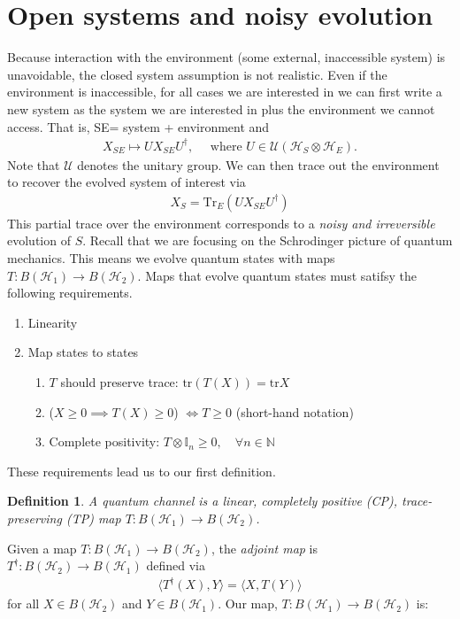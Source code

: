 \documentclass[10pt,oneside,longbibliography]{report}
\newtheorem{definition}{Definition}[section]
\begin{document}
\section{Open systems and noisy evolution}
Because interaction with the environment (some external, inaccessible system) is unavoidable, the closed system assumption is not realistic. Even if the environment is inaccessible, for all cases we are interested in we can first write a new system as the system we are interested in plus the environment we cannot access. That is, SE= system + environment and 
\begin{align}
X_{SE} \mapsto U X_{SE} U^{\dagger}, \quad \text{ where } U\in \mathcal{U}(\mathcal{H}_S\otimes \mathcal{H}_E).
\end{align}
Note that $\mathcal{U}$ denotes the unitary group. We can then trace out the environment to recover the evolved system of interest via
\begin{align}
    X_S = \text{Tr}_E (U X_{SE} U^{\dagger})
\end{align}
This partial trace over the environment corresponds to a \textit{noisy and irreversible} evolution of $S$. Recall that we are focusing on the Schrodinger picture of quantum mechanics. This means we evolve quantum states with maps $T:B(\mathcal{H}_1) \rightarrow B(\mathcal{H}_2)$. Maps that evolve quantum states must satifsy the following requirements. 
\begin{enumerate}
    \item Linearity
    \item Map states to states
    \begin{enumerate}
        \item $T$ should preserve trace: $\text{tr}(T(X))=\text{tr}X$
        \item ($X\geq 0 \implies T(X) \geq 0$) $\Leftrightarrow T \geq 0$ (short-hand notation)
        \item Complete positivity: $T\otimes \mathbb{I}_n \geq 0, \quad \forall n\in \mathbb{N}$
    \end{enumerate}
\end{enumerate}
These requirements lead us to our first definition. 
\begin{definition}
A quantum channel is a linear, completely positive (CP), trace-preserving (TP) map $T: B(\mathcal{H}_1)\rightarrow B(\mathcal{H}_2)$.
\end{definition}

Given a map $T: B(\mathcal{H}_1)\rightarrow B(\mathcal{H}_2)$, the \textit{adjoint map} is $T^{\dagger}:B(\mathcal{H}_2)\rightarrow B(\mathcal{H}_1)$ defined via
\begin{align}
    \langle T^{\dagger}(X),Y \rangle = \langle X, T(Y) \rangle 
\end{align}
for all $X\in B(\mathcal{H}_2)$ and $Y\in B(\mathcal{H}_1)$. Our map, $T: B(\mathcal{H}_1)\rightarrow B(\mathcal{H}_2)$ is: 
\end{document}
